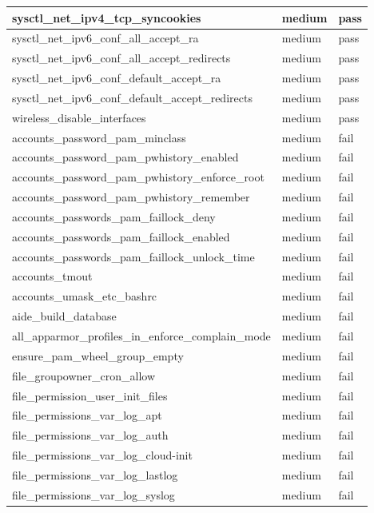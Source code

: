 \begin{longtable}{|p{10cm}|p{2cm}|p{2cm}|}
\hline
sysctl\_net\_ipv4\_tcp\_syncookies & medium & pass \\
\hline
sysctl\_net\_ipv6\_conf\_all\_accept\_ra & medium & pass \\
\hline
sysctl\_net\_ipv6\_conf\_all\_accept\_redirects & medium & pass \\
\hline
sysctl\_net\_ipv6\_conf\_default\_accept\_ra & medium & pass \\
\hline
sysctl\_net\_ipv6\_conf\_default\_accept\_redirects & medium & pass \\
\hline
wireless\_disable\_interfaces & medium & pass \\
\hline
accounts\_password\_pam\_minclass & medium & fail \\
\hline
accounts\_password\_pam\_pwhistory\_enabled & medium & fail \\
\hline
accounts\_password\_pam\_pwhistory\_enforce\_root & medium & fail \\
\hline
accounts\_password\_pam\_pwhistory\_remember & medium & fail \\
\hline
accounts\_passwords\_pam\_faillock\_deny & medium & fail \\
\hline
accounts\_passwords\_pam\_faillock\_enabled & medium & fail \\
\hline
accounts\_passwords\_pam\_faillock\_unlock\_time & medium & fail \\
\hline
accounts\_tmout & medium & fail \\
\hline
accounts\_umask\_etc\_bashrc & medium & fail \\
\hline
aide\_build\_database & medium & fail \\
\hline
all\_apparmor\_profiles\_in\_enforce\_complain\_mode & medium & fail \\
\hline
ensure\_pam\_wheel\_group\_empty & medium & fail \\
\hline
file\_groupowner\_cron\_allow & medium & fail \\
\hline
file\_permission\_user\_init\_files & medium & fail \\
\hline
file\_permissions\_var\_log\_apt & medium & fail \\
\hline
file\_permissions\_var\_log\_auth & medium & fail \\
\hline
file\_permissions\_var\_log\_cloud-init & medium & fail \\
\hline
file\_permissions\_var\_log\_lastlog & medium & fail \\
\hline
file\_permissions\_var\_log\_syslog & medium & fail \\

\end{longtable}
